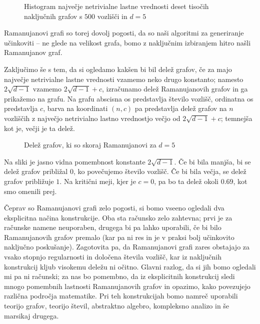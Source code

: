 \begin{figure}[H]
    \begin{center}
        
    \end{center}
    \caption{Histogram največje netrivialne lastne vrednosti deset tisočih naključnih grafov s \(500\) vozlišči in \(d=5\)}
\end{figure}

Ramanujanovi grafi so torej dovolj pogosti, da so naši algoritmi za generiranje učinkoviti -- ne glede na velikost grafa, bomo z naključnim izbiranjem hitro našli Ramanujanov graf.

Zaključimo še s tem, da si ogledamo kakšen bi bil delež grafov, če za majo največje netrivialne lastne vrednosti vzamemo neko drugo konstanto; namesto \(2\sqrt{d-1}\) vzamemo \(2\sqrt{d-1} + c\), izračunamo delež Ramanujanovih grafov in ga prikažemo na grafu. Na grafu abscisna os predstavlja število vozlišč, ordinatna os predstavlja \(c\), barva na koordinati \((n,c)\) pa predstavlja delež grafov na \(n\) vozliščih z največjo netrivialno lastno vrednostjo večjo od \(2\sqrt{d-1}+c\); temnejša kot je, večji je ta delež.
\begin{figure}[H]
    \begin{center}
        
    \end{center}
    \caption{Delež grafov, ki so skoraj Ramanujanovi za \(d=5\)}
\end{figure}
Na sliki je jasno vidna pomembnost konstante \(2\sqrt{d-1}\). Če bi bila manjša, bi se delež grafov približal \(0\), ko povečujemo število vozlišč. Če bi bila večja, se delež grafov približuje \(1\). Na kritični meji, kjer je \(c=0\), pa bo ta delež okoli \(0.69\), kot smo omenili prej.

Čeprav so Ramanujanovi grafi zelo pogosti, si bomo vseeno ogledali dva eksplicitna načina konstrukcije. Oba sta računsko zelo zahtevna; prvi je za računske namene neuporaben, drugega bi pa lahko uporabili, če bi bilo Ramanujanovih grafov premalo (kar pa ni res in je v praksi bolj učinkovito naključno poskušanje). Zagotovita pa, da Ramanujanovi grafi zares obstajajo za vsako stopnjo regularnosti in določena števila vozlišč, kar iz naključnih konstrukcij kljub visokemu deležu ni očitno. Glavni razlog, da si jih bomo ogledali mi pa ni računski; za nas bo pomembno, da iz eksplicitnih konstrukcij sledi mnogo pomembnih lastnosti Ramanujanovih grafov in opazimo, kako povezujejo različna področja matematike. Pri teh konstrukcijah bomo namreč uporabili teorijo grafov, teorijo števil, abstraktno algebro, kompleksno analizo in še marsikaj drugega.

